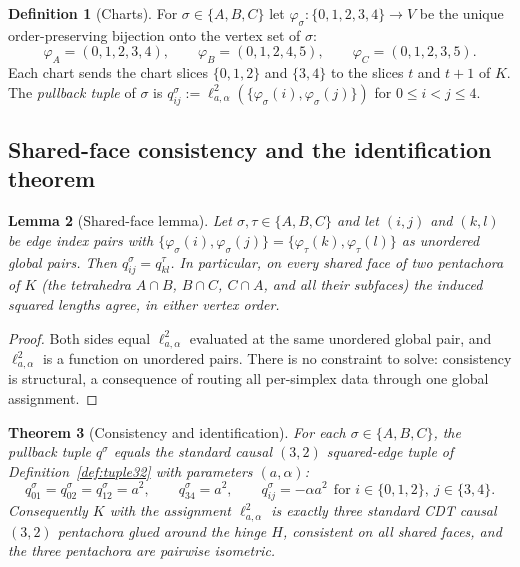 \documentclass[11pt]{article}
\newtheorem{theorem}{Theorem}[section]
\newtheorem{lemma}[theorem]{Lemma}
\theoremstyle{definition}
\newtheorem{definition}[theorem]{Definition}
\theoremstyle{remark}
\newcommand{\Kmin}{K}
\newcommand{\ltwo}{\ell^{2}_{a,\alpha}}
\begin{document}
\begin{definition}[Charts]
\label{def:charts}
For $\sigma\in\{A,B,C\}$ let $\varphi_{\sigma}:\{0,1,2,3,4\}\to V$ be the unique order-preserving bijection onto the vertex set of $\sigma$:
\[
\varphi_{A}=(0,1,2,3,4),\qquad
\varphi_{B}=(0,1,2,4,5),\qquad
\varphi_{C}=(0,1,2,3,5).
\]
Each chart sends the chart slices $\{0,1,2\}$ and $\{3,4\}$ to the slices $t$ and $t+1$ of $\Kmin$. The \emph{pullback tuple} of $\sigma$ is $q^{\sigma}_{ij}:=\ltwo(\{\varphi_{\sigma}(i),\varphi_{\sigma}(j)\})$ for $0\le i<j\le 4$.
\end{definition}

\subsection{Shared-face consistency and the identification theorem}

\begin{lemma}[Shared-face lemma]
\label{lem:sharedface}
Let $\sigma,\tau\in\{A,B,C\}$ and let $(i,j)$ and $(k,l)$ be edge index pairs with
$\{\varphi_{\sigma}(i),\varphi_{\sigma}(j)\}=\{\varphi_{\tau}(k),\varphi_{\tau}(l)\}$
as unordered global pairs. Then $q^{\sigma}_{ij}=q^{\tau}_{kl}$. In particular, on every shared face of two pentachora of $\Kmin$ (the tetrahedra $A\cap B$, $B\cap C$, $C\cap A$, and all their subfaces) the induced squared lengths agree, in either vertex order.
\end{lemma}

\begin{proof}
Both sides equal $\ltwo$ evaluated at the same unordered global pair, and $\ltwo$ is a function on unordered pairs. There is no constraint to solve: consistency is structural, a consequence of routing all per-simplex data through one global assignment.
\end{proof}

\begin{theorem}[Consistency and identification]
\label{thm:identification}
For each $\sigma\in\{A,B,C\}$, the pullback tuple $q^{\sigma}$ equals the standard causal $(3,2)$ squared-edge tuple of Definition~\ref{def:tuple32} with parameters $(a,\alpha)$:
\[
q^{\sigma}_{01}=q^{\sigma}_{02}=q^{\sigma}_{12}=a^{2},\qquad
q^{\sigma}_{34}=a^{2},\qquad
q^{\sigma}_{ij}=-\alpha a^{2}\ \ \text{for } i\in\{0,1,2\},\ j\in\{3,4\}.
\]
Consequently $\Kmin$ with the assignment $\ltwo$ is exactly three standard CDT causal $(3,2)$ pentachora glued around the hinge $H$, consistent on all shared faces, and the three pentachora are pairwise isometric.
\end{theorem}
\end{document}
